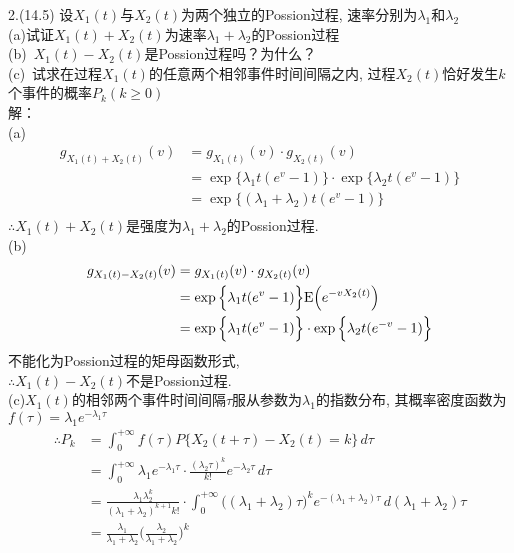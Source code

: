 2.(14.5) 设$X_1(t)$与$X_2(t)$为两个独立的Possion过程, 速率分别为$\lambda_1$和$\lambda_2$\\
(a)试证$X_1(t) + X_2(t)$为速率$\lambda_1+\lambda_2$的Possion过程\\
(b)~$X_1(t) - X_2(t)$是Possion过程吗？为什么？\\
(c)~试求在过程$X_1(t)$的任意两个相邻事件时间间隔之内, 过程$X_2(t)$恰好发生$k$个事件的概率$P_k(k\geqslant 0)$\\
解：\\
(a)
\[
\begin{split}
g_{X_1(t)+X_2(t)}(v) & = g_{X_1(t)}(v)\cdot g_{X_2(t)}(v)\\
					& = \exp\Big\{\lambda_1 t(e^v-1)\Big\}\cdot \exp\Big\{\lambda_2 t(e^v-1)\Big\}\\
					& = \exp\Big\{(\lambda_1+\lambda_2)t(e^v-1)\Big\}\\
\end{split}
\]
$\therefore X_1(t) + X_2(t)$是强度为$\lambda_1+\lambda_2$的Possion过程.\\
(b)
\[
\begin{split}
g_{X_1(t)-X_2(t)}(v) & = g_{X_1(t)}(v)\cdot g_{X_2(t)}(v)\\
					& = \exp\Big\{\lambda_1 t(e^v-1)\Big\}\mathrm{E}\Big(e^{-vX_2(t)}\Big)\\
					& = \exp\Big\{\lambda_1 t(e^v-1)\Big\}\cdot \exp\Big\{\lambda_2 t(e^{-v}-1)\Big\}\\
\end{split}
\]
不能化为Possion过程的矩母函数形式,\\
$\therefore X_1(t) - X_2(t)$不是Possion过程.\\
(c)$X_1(t)$的相邻两个事件时间间隔$\tau$服从参数为$\lambda_1$的指数分布, 其概率密度函数为$f(\tau) = \lambda_1 e^{-\lambda_1\tau}$\\
\[
\begin{split}
\therefore P_k & = \int^{+\infty}_0	f(\tau)P\Big\{X_2(t+\tau)-X_2(t) = k\Big\}\,d\tau\\
			& = \int^{+\infty}_0 \lambda_1 e^{-\lambda_1\tau}\cdot \frac{(\lambda_2\tau)^k}{k!}e^{-\lambda_2\tau}\,d\tau\\
			& = \frac{\lambda_1\lambda^k_2}{(\lambda_1+\lambda_2)^{k+1}k!}\cdot \int^{+\infty}_0 \big((\lambda_1+\lambda_2)\tau\big)^ke^{-(\lambda_1+\lambda_2)\tau}\,d(\lambda_1+\lambda_2)\tau\\
			& = \frac{\lambda_1}{\lambda_1+\lambda_2}\bigg(\frac{\lambda_2}{\lambda_1+\lambda_2}\bigg)^k
\end{split}
\]
